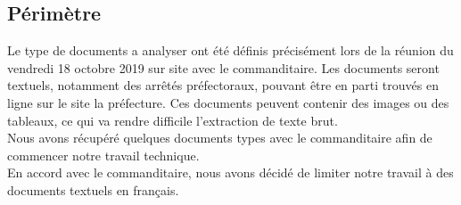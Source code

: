 \subsection {Périmètre}
Le type de documents a analyser ont été définis précisément lors de la réunion du vendredi 18 octobre 2019 sur site avec le commanditaire.
Les documents seront textuels, notamment des arrêtés préfectoraux, pouvant être en parti trouvés en ligne sur le site la préfecture.
Ces documents peuvent contenir des images ou des tableaux, ce qui va rendre difficile l'extraction de texte brut.
\\
Nous avons récupéré quelques documents types avec le commanditaire afin de commencer notre travail technique.
\\
En accord avec le commanditaire, nous avons décidé de limiter notre travail à des documents textuels en français.







